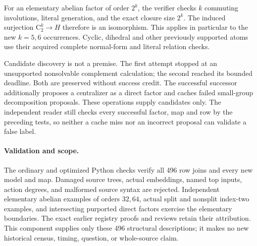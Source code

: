 \documentclass[11pt]{article}
\newcommand{\C}{\mathrm C}
\begin{document}
For an elementary abelian factor of order $2^k$, the verifier checks
$k$ commuting involutions, literal generation, and the exact closure size
$2^k$. The induced surjection $\C_2^k\to H$ therefore is an isomorphism.
This applies in particular to the new $k=5,6$ occurrences. Cyclic,
dihedral and other previously supported atoms use their acquired complete
normal-form and literal relation checks.

Candidate discovery is not a premise. The first attempt stopped at an
unsupported nonsolvable complement calculation; the second reached its
bounded deadline. Both are preserved without success credit. The successful
successor additionally proposes a centralizer as a direct factor and caches
failed small-group decomposition proposals. These operations supply
candidates only. The independent reader still checks every successful
factor, map and row by the preceding tests, so neither a cache miss nor an
incorrect proposal can validate a false label.

\paragraph{Validation and scope.}
The ordinary and optimized Python checks verify all 496 row joins and every
new model and map. Damaged source trees, actual embeddings, named top
inputs, action degrees, and malformed source syntax are rejected.
Independent elementary abelian examples of orders $32,64$, actual split
and nonsplit index-two examples, and intersecting purported direct factors
exercise the elementary boundaries. The exact earlier registry proofs and
reviews retain their attribution. This component supplies only these
496 structural descriptions; it makes no new historical census, timing,
question, or whole-source claim.
\end{document}

